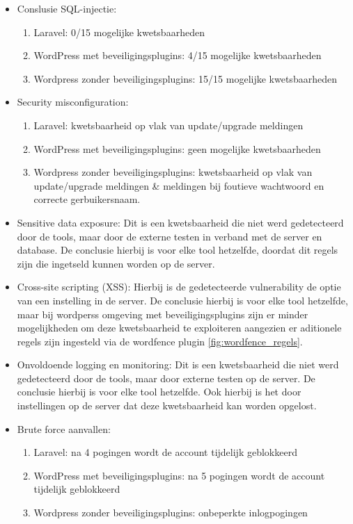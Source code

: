   \begin{itemize}
    \item Conslusie SQL-injectie:
    \begin{enumerate}
      \item Laravel: 0/15 mogelijke kwetsbaarheden
      \item WordPress met beveiligingsplugins: 4/15 mogelijke kwetsbaarheden
      \item Wordpress zonder beveiligingsplugins: 15/15 mogelijke kwetsbaarheden
    \end{enumerate}
    \item Security misconfiguration:
    \begin{enumerate}
      \item Laravel: kwetsbaarheid op vlak van update/upgrade meldingen
      \item WordPress met beveiligingsplugins: geen mogelijke kwetsbaarheden
      \item Wordpress zonder beveiligingsplugins: kwetsbaarheid op vlak van update/upgrade meldingen \& meldingen bij 
            foutieve wachtwoord en correcte gerbuikersnaam.
    \end{enumerate}
    \item Sensitive data exposure: Dit is een kwetsbaarheid die niet werd gedetecteerd door de tools, maar door de 
          externe testen in verband met de server en database. De conclusie hierbij is voor elke tool hetzelfde, doordat dit 
          regels zijn die ingetseld kunnen worden op de server.
    \item Cross-site scripting (XSS): Hierbij is de gedetecteerde vulnerability de optie van een instelling in de 
          server. De conclusie hierbij is voor elke tool hetzelfde, maar bij wordperss omgeving met beveiligingsplugins 
          zijn er minder mogelijkheden om deze kwetsbaarheid te exploiteren aangezien er aditionele regels zijn ingesteld 
          via de wordfence plugin \ref{fig:wordfence_regels}.
    \item Onvoldoende logging en monitoring: Dit is een kwetsbaarheid die niet werd gedetecteerd door de tools, maar door 
          externe testen op de server. De conclusie hierbij is voor elke tool hetzelfde. Ook hierbij is het door instellingen 
          op de server dat deze kwetsbaarheid kan worden opgelost.
    \item Brute force aanvallen:
    \begin{enumerate}
      \item Laravel: na 4 pogingen wordt de account tijdelijk geblokkeerd
      \item WordPress met beveiligingsplugins: na 5 pogingen wordt de account tijdelijk geblokkeerd
      \item Wordpress zonder beveiligingsplugins: onbeperkte inlogpogingen
    \end{enumerate}
  \end{itemize}

